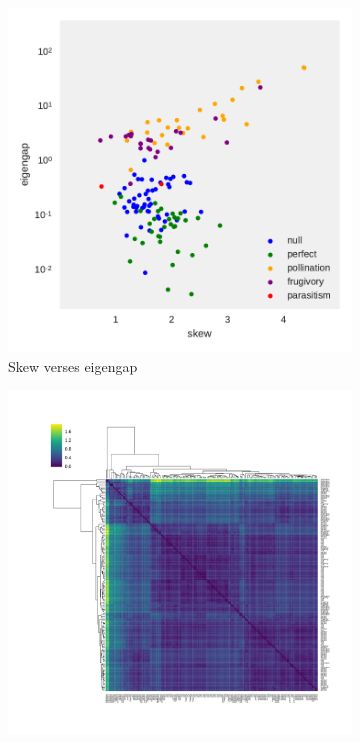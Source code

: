 \begin{figure}
    \centering
    \begin{subfigure}[b]{0.45\textwidth}
        \includegraphics[width=\textwidth]{FishPoo/figures/codiv_literature_skew_eigengap.pdf}
        \caption{Skew verses eigengap}
    \end{subfigure}
    \begin{subfigure}[b]{0.5\textwidth}
        \includegraphics[width=\textwidth]{FishPoo/figures/codiv_literature_clustermap.pdf}

\end{subfigure}
\end{figure}

